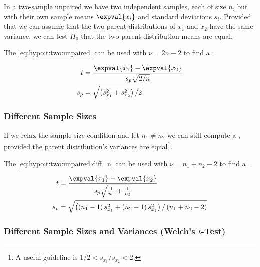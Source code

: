 In a two-sample unpaired \ttest we have two independent samples, each of size $n$,
but with their own sample means $\expval{x_{i}}$ and standard deviations $s_{i}$.
Provided that we can assume that the two parent distributions of $x_{1}$ and $x_{2}$ have the same variance,
we can test $H_{0}$ that the two parent distribution means are equal.

The \tstat \cref{eq:hypo:t:two:unpaired} can be used with $\nu = 2n-2$ to find a \pvalue.

\begin{subequations}\label{eq:hypo:t:two:unpaired}
\begin{align}
t &= \frac{\expval{x_{1}} - \expval{x_{2}}}{s_{p} \sqrt{2/n}} \label{eq:hypo:t:two:unpaired:t} \\
s_{p} &= \sqrt{\left(s^{2}_{x_{1}} + s^{2}_{x_{2}}\right)/2} \label{eq:hypo:t:two:unpaired:s_p}
\end{align}
\end{subequations}

\subsubsection{Different Sample Sizes}
\label{hypo:t_test:two:unpaired:diff_n}

If we relax the sample size condition and let $n_{1} \neq n_{2}$
we can still compute a \tstat,
provided the parent distribution's variances are equal\footnote{A useful guideline is $1/2 < s_{x_{1}} / s_{x_{2}} < 2$.}.

The \tstat \cref{eq:hypo:t:two:unpaired:diff_n} can be used with $\nu = n_{1} + n_{2} - 2$ to find a \pvalue.

\begin{subequations}\label{eq:hypo:t:two:unpaired:diff_n}
\begin{align}
t &= \frac{\expval{x_{1}} - \expval{x_{2}}}{s_{p} \sqrt{\frac{1}{n_{1}} + \frac{1}{n_{2}}}} \label{eq:hypo:t:two:unpaired:diff_n:t} \\
s_{p} &= \sqrt{\left(\left(n_{1} - 1\right)s^{2}_{x_{1}} + \left(n_{2} - 1\right)s^{2}_{x_{2}}\right)/\left(n_{1} + n_{2} -2\right)} \label{eq:hypo:t:two:unpaired:diff_n:s_p}
\end{align}
\end{subequations}

\subsubsection{Different Sample Sizes and Variances (Welch's \texorpdfstring{$t$}{t}-Test)}
\label{hypo:t_test:two:unpaired:diff_n_diff_var}

